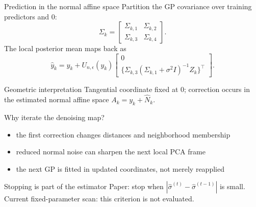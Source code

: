 \documentclass[aspectratio=169,10pt]{beamer}
\begin{document}
\begin{frame}{Prediction in the normal affine space}
  Partition the GP covariance over training predictors and \(0\):
  \[
    \Sigma_k=
    \begin{bmatrix}
      \Sigma_{k,1}&\Sigma_{k,2}\\
      \Sigma_{k,3}&\Sigma_{k,4}
    \end{bmatrix}.
  \]
  The local posterior mean maps back as
  \[
    \widehat y_k
      =y_k+U_{n,\epsilon}(y_k)
      \begin{bmatrix}
        0\\
        \{\Sigma_{k,3}(\Sigma_{k,1}+\sigma^2I)^{-1}Z_k\}^{\!\top}
      \end{bmatrix}.
  \]
  \begin{alertblock}{Geometric interpretation}
    Tangential coordinate fixed at \(0\); correction occurs in the estimated
    normal affine space \(A_k=y_k+\widehat N_k\).
  \end{alertblock}
\end{frame}

\begin{frame}{Why iterate the denoising map?}
  \begin{center}
  \end{center}
  \vspace{0.35cm}
  \begin{itemize}
    \item the first correction changes distances and neighborhood membership
    \item reduced normal noise can sharpen the next local PCA frame
    \item the next GP is fitted in updated coordinates, not merely reapplied
  \end{itemize}
  \begin{alertblock}{Stopping is part of the estimator}
    Paper: stop when $|\widehat\sigma^{(t)}-\widehat\sigma^{(t-1)}|$ is small.
    Current fixed-parameter scan: this criterion is not evaluated.
  \end{alertblock}
\end{frame}
\end{document}
